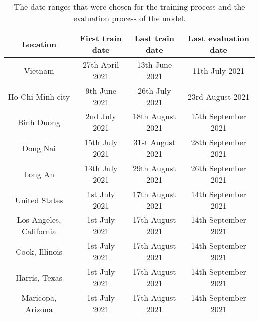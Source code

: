 \begin{table}[h]
    \centering
    \begin{tabular}{| c | c | c | c |}
        Location & First train date & Last train date & Last evaluation date \\
        \hline\hline
        Vietnam & 27th April 2021 & 13th June 2021 & 11th July 2021 \\
        \hline
        Ho Chi Minh city & 9th June 2021 & 26th July 2021 & 23rd August 2021 \\
        \hline
        Binh Duong & 2nd July 2021 & 18th August 2021 & 15th September 2021 \\
        \hline
        Dong Nai & 15th July 2021 & 31st August 2021 & 28th September 2021 \\
        \hline
        Long An & 13th July 2021 & 29th August 2021 & 26th September 2021 \\
        \hline
        United States & 1st July 2021 & 17th August 2021 & 14th September 2021 \\
        \hline
        Los Angeles, California & 1st July 2021 & 17th August 2021 & 14th September 2021 \\
        \hline
        Cook, Illinois & 1st July 2021 & 17th August 2021 & 14th September 2021 \\
        \hline
        Harris, Texas & 1st July 2021 & 17th August 2021 & 14th September 2021 \\
        \hline
        Maricopa, Arizona & 1st July 2021 & 17th August 2021 & 14th September 2021 \\
        \hline
    \end{tabular}
    \caption[Experiment training and testing periods]{The date ranges that were chosen for the training process and the evaluation process of the model.}
    \label{tab:chosen-dataset-dates}
\end{table}

